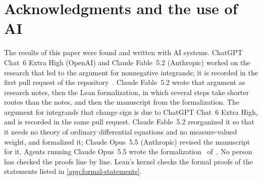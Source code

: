 \section*{Acknowledgments and the use of AI}

The results of this paper were found and written with AI systems. ChatGPT Chat~6 Extra High
(OpenAI) and Claude Fable~5.2 (Anthropic) worked on the research that led to the argument for
nonnegative integrands; it is recorded in the first pull request of the
repository~\cite{Companion}. Claude Fable~5.2 wrote that argument as research notes, then the
Lean formalization, in which several steps take shorter routes than the notes, and then the
manuscript from the formalization. The argument for integrands that change sign is due to
ChatGPT Chat~6 Extra High, and is recorded in the same pull request. Claude Fable~5.2
reorganized it so that it needs no theory of ordinary differential equations and no
measure-valued weight, and formalized it; Claude Opus~5.5 (Anthropic) revised the manuscript for
it. Agents running Claude Opus~5.5 wrote the formalization~\cite{IwaniecLean} of~\cite{SharpHI}.
No person has checked the proofs line by line. Lean's kernel checks the formal proofs of the
statements listed in \cref{app:formal-statements}.

